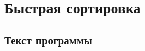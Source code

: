 \documentclass[bachelor, och, referat, times]{SCWorks}
\begin{document}
    
   
    
    \maketitle

    
    

    
    
   \tableofcontents
    
    
    
    

    \section{Быстрая сортировка}
    \subsection{Текст программы}
\end{document}
